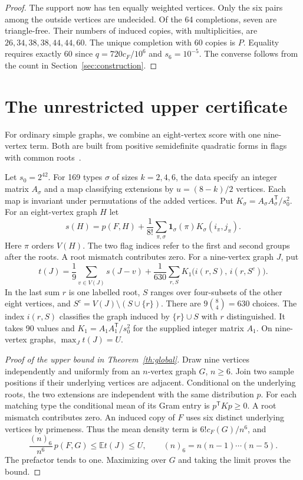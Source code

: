 \documentclass[11pt,a4paper]{article}
\newcommand{\E}{\mathbb E}
\newcommand{\one}{\mathbf 1}
\newcommand{\trans}{\mathsf T}
\begin{document}
\begin{proof}
The support now has ten equally weighted vertices. Only the six pairs among the outside vertices are undecided. Of the 64 completions, seven are triangle-free. Their numbers of induced copies, with multiplicities, are \(26,34,38,38,44,44,60\). The unique completion with 60 copies is \(P\). Equality requires exactly 60 since \(q=720c_F/10^6\) and \(s_6=10^{-5}\). The converse follows from the count in Section~\ref{sec:construction}.
\end{proof}

\section{The unrestricted upper certificate}\label{sec:upper}

For ordinary simple graphs, we combine an eight-vertex score with one nine-vertex term. Both are built from positive semidefinite quadratic forms in flags with common roots~\cite{raz}.

Let \(s_0=2^{42}\). For 169 types \(\sigma\) of sizes \(k=2,4,6\), the data specify an integer matrix \(A_\sigma\) and a map classifying extensions by \(u=(8-k)/2\) vertices. Each map is invariant under permutations of the added vertices. Put \(K_\sigma=A_\sigma A_\sigma^{\trans}/s_0^2\). For an eight-vertex graph \(H\) let
\[
 s(H)=p(F,H)+\frac1{8!}\sum_{\pi,\sigma}
       \one_\sigma(\pi) K_\sigma(i_\pi,j_\pi).
\]
Here \(\pi\) orders \(V(H)\). The two flag indices refer to the first and second groups after the roots. A root mismatch contributes zero.
For a nine-vertex graph \(J\), put
\begin{equation}\label{eq:nine}
 t(J)=\frac19\sum_{v\in V(J)}s(J-v)
  +\frac1{630}\sum_{r,S} K_1\big(i(r,S),\,i(r,S^{c})\big).
\end{equation}
In the last sum \(r\) is one labelled root, \(S\) ranges over four-subsets of the other eight vertices, and \(S^c=V(J)\setminus(S\cup\{r\})\). There are \(9\binom84=630\) choices. The index \(i(r,S)\) classifies the graph induced by \(\{r\}\cup S\) with \(r\) distinguished. It takes 90 values and \(K_1=A_1A_1^{\trans}/s_0^2\) for the supplied integer matrix \(A_1\). On nine-vertex graphs, \(\max_J t(J)=U\).

\begin{proof}[Proof of the upper bound in Theorem~\ref{th:global}]
Draw nine vertices independently and uniformly from an \(n\)-vertex graph \(G\), \(n\ge6\). Join two sample positions if their underlying vertices are adjacent. Conditional on the underlying roots, the two extensions are independent with the same distribution \(p\). For each matching type the conditional mean of its Gram entry is \(p^{\trans}Kp\ge0\). A root mismatch contributes zero. An induced copy of \(F\) uses six distinct underlying vertices by primeness. Thus the mean density term is \(6!c_F(G)/n^6\), and
\[
 \frac{(n)_6}{n^6}\,p(F,G)\le \E t(J)\le U,\qquad
 (n)_6=n(n-1)\cdots(n-5).
\]
The prefactor tends to one. Maximizing over \(G\) and taking the limit proves the bound.
\end{proof}
\end{document}
